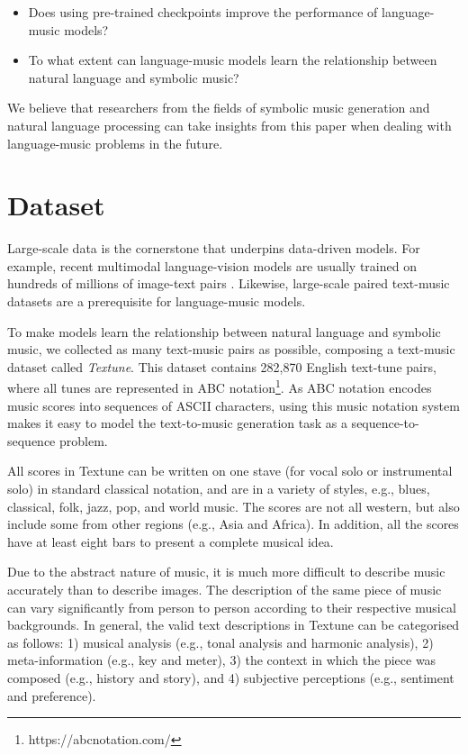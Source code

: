 \documentclass[letterpaper]{article} %
\begin{document}
\begin{itemize}
\item Does using pre-trained checkpoints improve the performance of language-music models?
\item To what extent can language-music models learn the relationship between natural language and symbolic music?
\end{itemize}
\textbf{\textit{}}

We believe that researchers from the fields of symbolic music generation and natural language processing can take insights from this paper when dealing with language-music problems in the future.

\section{Dataset}
Large-scale data is the cornerstone that underpins data-driven models. For example, recent multimodal language-vision models are usually trained on hundreds of millions of image-text pairs \cite{DBLP:journals/corr/abs-2111-02114}. Likewise, large-scale paired text-music datasets are a prerequisite for language-music models.

To make models learn the relationship between natural language and symbolic music, we collected as many text-music pairs as possible, composing a text-music dataset called \textit{Textune}. This dataset contains 282,870 English text-tune pairs, where all tunes are represented in ABC notation\footnote{https://abcnotation.com/}. As ABC notation encodes music scores into sequences of ASCII characters, using this music notation system makes it easy to model the text-to-music generation task as a sequence-to-sequence problem.

All scores in Textune can be written on one stave (for vocal solo or instrumental solo) in standard classical notation, and are in a variety of styles, e.g., blues, classical, folk, jazz, pop, and world music. The scores are not all western, but also include some from other regions (e.g., Asia and Africa). In addition, all the scores have at least eight bars to present a complete musical idea.

Due to the abstract nature of music, it is much more difficult to describe music accurately than to describe images. The description of the same piece of music can vary significantly from person to person according to their respective musical backgrounds. In general, the valid text descriptions in Textune can be categorised as follows: 1) musical analysis (e.g., tonal analysis and harmonic analysis), 2) meta-information (e.g., key and meter), 3) the context in which the piece was composed (e.g., history and story), and 4) subjective perceptions (e.g., sentiment and preference).
\end{document}
